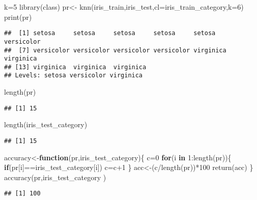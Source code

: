 \documentclass[
]{article}
\newenvironment{Shaded}{\begin{snugshade}}{\end{snugshade}}
\newcommand{\AttributeTok}[1]{\textcolor[rgb]{0.77,0.63,0.00}{#1}}
\newcommand{\ControlFlowTok}[1]{\textcolor[rgb]{0.13,0.29,0.53}{\textbf{#1}}}
\newcommand{\DecValTok}[1]{\textcolor[rgb]{0.00,0.00,0.81}{#1}}
\newcommand{\FunctionTok}[1]{\textcolor[rgb]{0.00,0.00,0.00}{#1}}
\newcommand{\NormalTok}[1]{#1}
\newcommand{\OtherTok}[1]{\textcolor[rgb]{0.56,0.35,0.01}{#1}}
\newcommand{\SpecialCharTok}[1]{\textcolor[rgb]{0.00,0.00,0.00}{#1}}
\begin{document}
\begin{Shaded}
\begin{Highlighting}[]
\NormalTok{k}\OtherTok{=}\DecValTok{5}
\FunctionTok{library}\NormalTok{(class)}
\NormalTok{pr}\OtherTok{\textless{}{-}} \FunctionTok{knn}\NormalTok{(iris\_train,iris\_test,}\AttributeTok{cl=}\NormalTok{iris\_train\_category,}\AttributeTok{k=}\DecValTok{6}\NormalTok{)}
\FunctionTok{print}\NormalTok{(pr)}
\end{Highlighting}
\end{Shaded}

\begin{verbatim}
##  [1] setosa     setosa     setosa     setosa     setosa     versicolor
##  [7] versicolor versicolor versicolor versicolor virginica  virginica 
## [13] virginica  virginica  virginica 
## Levels: setosa versicolor virginica
\end{verbatim}

\begin{Shaded}
\begin{Highlighting}[]
\FunctionTok{length}\NormalTok{(pr)}
\end{Highlighting}
\end{Shaded}

\begin{verbatim}
## [1] 15
\end{verbatim}

\begin{Shaded}
\begin{Highlighting}[]
\FunctionTok{length}\NormalTok{(iris\_test\_category)}
\end{Highlighting}
\end{Shaded}

\begin{verbatim}
## [1] 15
\end{verbatim}

\begin{Shaded}
\begin{Highlighting}[]
\NormalTok{accuracy}\OtherTok{\textless{}{-}}\ControlFlowTok{function}\NormalTok{(pr,iris\_test\_category)\{}
\NormalTok{  c}\OtherTok{=}\DecValTok{0}
  \ControlFlowTok{for}\NormalTok{(i }\ControlFlowTok{in} \DecValTok{1}\SpecialCharTok{:}\FunctionTok{length}\NormalTok{(pr))\{}
    \ControlFlowTok{if}\NormalTok{(pr[i]}\SpecialCharTok{==}\NormalTok{iris\_test\_category[i])}
\NormalTok{      c}\OtherTok{=}\NormalTok{c}\SpecialCharTok{+}\DecValTok{1}
\NormalTok{  \}}
\NormalTok{  acc}\OtherTok{\textless{}{-}}\NormalTok{(c}\SpecialCharTok{/}\FunctionTok{length}\NormalTok{(pr))}\SpecialCharTok{*}\DecValTok{100}
  \FunctionTok{return}\NormalTok{(acc)}
\NormalTok{\}}
\FunctionTok{accuracy}\NormalTok{(pr,iris\_test\_category )}
\end{Highlighting}
\end{Shaded}

\begin{verbatim}
## [1] 100
\end{verbatim}
\end{document}
